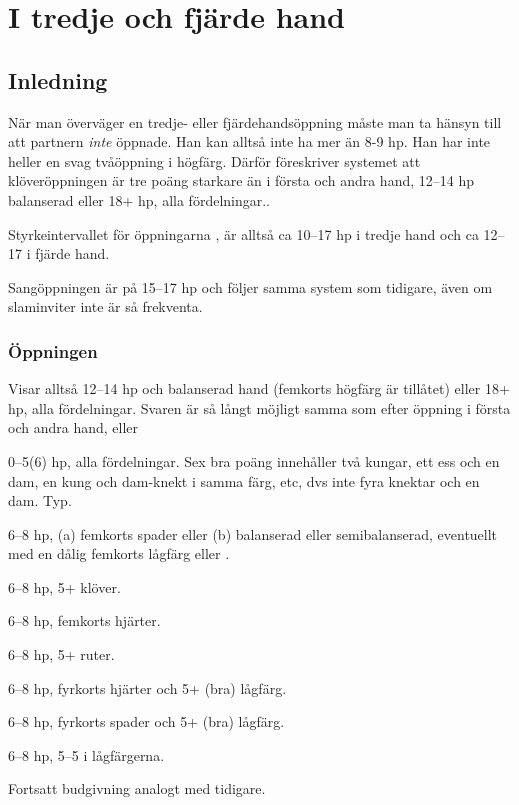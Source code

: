 \chapter{I tredje och fjärde hand}

\section{Inledning}

När man överväger en tredje- eller fjärdehandsöppning måste man ta
hänsyn till att partnern {\em inte} öppnade. Han kan alltså inte ha
mer än 8-9 hp. Han har inte heller
en svag tvåöppning i högfärg. Därför föreskriver 
systemet att klöveröppningen är tre poäng starkare än  i första och andra
hand, 12--14 hp balanserad eller 18+ hp, alla fördelningar.. 

Styrkeintervallet för öppningarna ,  är alltså
ca 10--17 hp i tredje hand och ca 12--17 i fjärde hand.

Sangöppningen är på 15--17 hp och följer samma system som tidigare, även om
slaminviter inte är så frekventa. 

\subsection{Öppningen }

Visar alltså 12--14 hp och balanserad hand (femkorts högfärg är tillåtet)
eller 18+ hp, alla fördelningar. Svaren är så långt möjligt samma som efter
öppning i första och andra hand, eller

\bbe

\item[--\ru{1}] 0--5(6) hp, alla fördelningar. Sex bra poäng innehåller två
  kungar, ett ess och en dam, en kung och dam-knekt i samma färg, etc, dvs
  inte fyra knektar och en dam. Typ.

\item[--\hj{1}] 6--8 hp, (a) femkorts spader eller (b) balanserad eller
  semibalanserad, eventuellt med en dålig femkorts lågfärg eller \marmic.

\item[--\spa{1}] 6--8 hp, 5+ klöver.

\item[--NT{1}] 6--8 hp, femkorts hjärter.

\item[--\kl{2}] 6--8 hp, 5+ ruter.

\item[--\ru{2}] 6--8 hp, fyrkorts hjärter och 5+ (bra) lågfärg.
  
\item[--\hj{2}] 6--8 hp, fyrkorts spader och 5+ (bra) lågfärg.

\item[--\spa{2}] 6--8 hp, 5--5 i lågfärgerna.
    
\ebe

Fortsatt budgivning analogt med tidigare.
